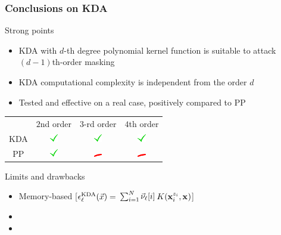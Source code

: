 \begin{frame}
\frametitle{Conclusions on KDA}
\vspace*{-10pt}
\begin{block}{Strong points}
\begin{itemize}
\item KDA with $d$-th degree polynomial kernel function is suitable to attack $(d-1)$th-order masking
\item KDA computational complexity is independent from the order $d$
\item Tested and effective on a real case, positively compared to PP 
\end{itemize}
\begin{table}[]
\begin{tabular}{cccc}
    & $2$nd order & $3$-rd order & $4$th order \\
KDA & \includegraphics[width=10pt]{figures/yes.png}          & \includegraphics[width=10pt]{figures/yes.png}           & \includegraphics[width=10pt]{figures/yes.png}          \\
PP  & \includegraphics[width=10pt]{figures/yes.png}          & \includegraphics[width=10pt]{figures/no.png}            & \includegraphics[width=10pt]{figures/no.png}          
\end{tabular}
\end{table}
\end{block}

\begin{block}{Limits and drawbacks}
\begin{itemize}
\item Memory-based [$\extract^{\mathrm{KDA}}_{\ell}(\vec{x}) =$ \textcolor{red}{$\sum_{i=1}^{\NPoI}$}$\nununu_\ell[i]$\textcolor{red}{$K(\sss[z_i]{i}, \sss[]{})$}]
\item {}
\item {}
\end{itemize}

\end{block}

\end{frame}
